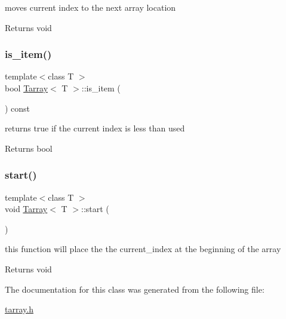 moves current index to the next array location 

\begin{DoxyReturn}{Returns}
void 
\end{DoxyReturn}
\mbox{\label{class_tarray_ab4047d306cc681cee5b665f0cca887f1}} 
\subsubsection{\texorpdfstring{is\+\_\+item()}{is\_item()}}
{\footnotesize\ttfamily template$<$class T $>$ \\
bool \hyperlink{class_tarray}{Tarray}$<$ T $>$\+::is\+\_\+item (\begin{DoxyParamCaption}{ }\end{DoxyParamCaption}) const}



returns true if the current index is less than used 

\begin{DoxyReturn}{Returns}
bool 
\end{DoxyReturn}
\mbox{\label{class_tarray_afdf48d2a03b6b1c110818998b6a86a38}} 
\subsubsection{\texorpdfstring{start()}{start()}}
{\footnotesize\ttfamily template$<$class T $>$ \\
void \hyperlink{class_tarray}{Tarray}$<$ T $>$\+::start (\begin{DoxyParamCaption}{ }\end{DoxyParamCaption})}



this function will place the the current\+\_\+index at the beginning of the array 

\begin{DoxyReturn}{Returns}
void 
\end{DoxyReturn}


The documentation for this class was generated from the following file\+:\begin{DoxyCompactItemize}
\item 
\hyperlink{tarray_8h}{tarray.\+h}\end{DoxyCompactItemize}
